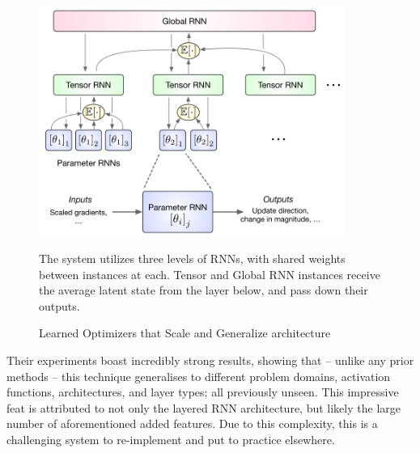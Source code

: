 \documentclass{report}
\begin{document}
	\begin{figure}[h]
	\centering
	\includegraphics[width=10cm]{scalearchitecture}
	\caption{Learned Optimizers that Scale and Generalize architecture}
	The system utilizes three levels of RNNs, with shared weights between instances at each. Tensor and Global RNN instances receive the average latent state from the layer below, and pass down their outputs.
	\label{fig:optimizer-that-scale:1}
	\end{figure}
	Their experiments boast incredibly strong results, showing that -- unlike any prior methods -- this technique generalises to different problem domains, activation functions, architectures, and layer types; all previously unseen. This impressive feat is attributed to not only the layered RNN architecture, but likely the large number of aforementioned added features. Due to this complexity, this is a challenging system to re-implement and put to practice elsewhere. \par
	
\end{document}
